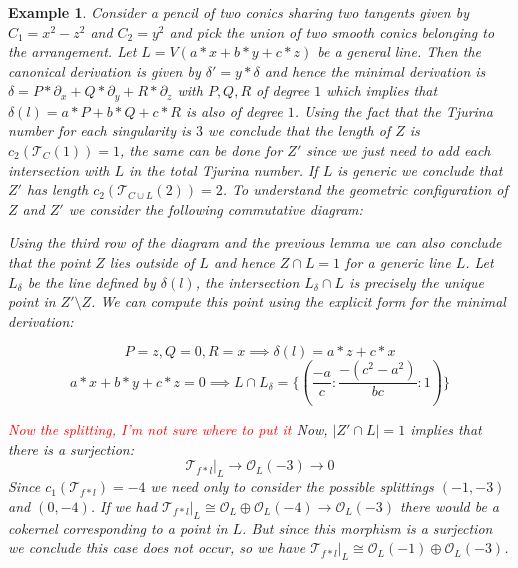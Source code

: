 \documentclass{article}
\newtheorem{example}{Example}[section]
\begin{document}
\begin{example}
    Consider a pencil of two conics sharing two tangents given by $C_1 = x^2-z^2$ and $C_2 = y^2$ and pick the union of two smooth conics belonging to the arrangement. Let $L = V(a*x+b*y+c*z)$ be a general line. Then the canonical derivation is given by $\delta' = y*\delta$ and hence the minimal derivation is $\delta = P*\partial_x + Q*\partial_y + R*\partial_z$ with $P,Q,R$ of degree $1$ which implies that $\delta(l) = a*P + b*Q + c*R$ is also of degree $1$. Using the fact that the Tjurina number for each singularity is $3$ we conclude that the length of $Z$ is $c_2(\mathcal{T}_C(1)) = 1$, the same can be done for $Z'$ since we just need to add each intersection with $L$ in the total Tjurina number. If $L$ is generic we conclude that $Z'$ has length $c_2(\mathcal{T}_{C \cup L}(2)) = 2$. To understand the geometric configuration of $Z$ and $Z'$ we consider the following commutative diagram:
    \begin{center}
    \end{center}
    Using the third row of the diagram and the previous lemma we can also conclude that the point $Z$ lies outside of $L$ and hence $Z \cap L = 1$ for a generic line $L$. Let $L_{\delta}$ be the line defined by $\delta(l)$, the intersection $L_{\delta} \cap L$ is precisely the unique point in $Z' \setminus Z$. We can compute this point using the explicit form for the minimal derivation:

    $$P = z, Q = 0, R = x \implies \delta(l) = a*z+c*x$$
    $$a*x+b*y+c*z = 0 \implies L \cap L_{\delta} = \{(\frac{-a}{c}:\frac{-(c^2-a^2)}{bc}:1) \}$$

    \textcolor{red}{Now the splitting, I'm not sure where to put it}
    Now, $|Z' \cap L| = 1$ implies that there is a surjection:
    \begin{equation}
        {\mathcal{T}_{f*l}}|_L \to \mathcal{O}_L(-3) \to 0
    \end{equation}
    Since $c_1(\mathcal{T}_{f*l}) = -4$ we need only to consider the possible splittings $(-1,-3)$ and $(0,-4)$. If we had ${\mathcal{T}_{f*l}}|_L \cong \mathcal{O}_L \oplus \mathcal{O}_L(-4) \to \mathcal{O}_L(-3)$ there would be a cokernel corresponding to a point in $L$. But since this morphism is a surjection we conclude this case does not occur, so we have ${\mathcal{T}_{f*l}}|_L \cong \mathcal{O}_L(-1) \oplus \mathcal{O}_L(-3)$.
\end{example}
\end{document}
